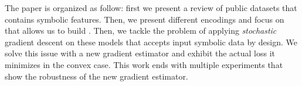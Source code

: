The paper is organized as follow: first we present a review of public datasets that contains symbolic features. Then, we present different encodings and focus on \ohe that allows us to build \catmod. %
Then, we tackle the problem of applying \textit{stochastic} gradient descent on these models that accepts input symbolic data by design. We solve this issue with a new gradient estimator and exhibit the actual loss it minimizes in the convex case. This work ends with multiple experiments that show the robustness of the new gradient estimator. 




